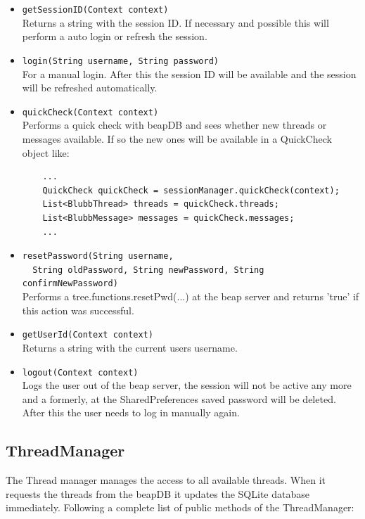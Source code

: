 \documentclass[12pt,a4paper,oneside]{report}
\newcommand{\beapDB}{beapDB}
\newcommand{\beapServer}{beap server}
\newcommand{\code}[1]{\lstinline{#1}}
\begin{document}
\begin{itemize}
\item{\code{getSessionID(Context context)}}\\
Returns a string with the session ID. If necessary and possible this will perform a auto login or refresh the session.

\item{\code{login(String username, String password)}}\\
For a manual login. After this the session ID will be available and the session will be refreshed automatically.

\item{\code{quickCheck(Context context)}}\\
Performs a quick check with \beapDB{} and sees whether new threads or messages available. If so the new ones will be available in a QuickCheck object like: 
\begin{lstlisting}
	...
	QuickCheck quickCheck = sessionManager.quickCheck(context);
	List<BlubbThread> threads = quickCheck.threads;
	List<BlubbMessage> messages = quickCheck.messages;
	...
\end{lstlisting}

\item{\code{resetPassword(String username,}\\
\code{	String oldPassword, String newPassword, String confirmNewPassword)}}\\
Performs a tree.functions.resetPwd(...) at the \beapServer{} and returns 'true' if this action was successful.

\item{\code{getUserId(Context context)}}\\
Returns a string with the current users username.

\item{\code{logout(Context context)}}\\
Logs the user out of the \beapServer{}, the session will not be active any more and a formerly, at the SharedPreferences saved password will be deleted. After this the user needs to log in manually again.
\end{itemize}

\subsection{ThreadManager}
The Thread manager manages the access to all available threads. When it requests the threads from the \beapDB{} it updates the SQLite database immediately. Following a complete list of public methods of the ThreadManager:
\end{document}
